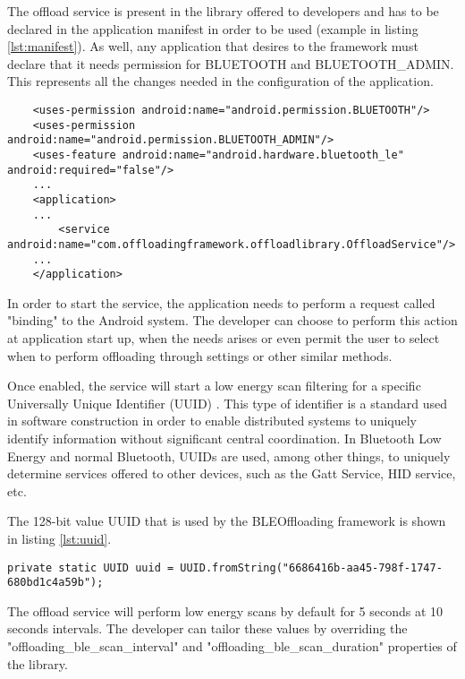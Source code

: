 The offload service is present in the library offered to developers and has to be declared in the application manifest in order to be used (example in listing \ref{lst:manifest}). As well, any application that desires to the framework must declare that it needs permission for BLUETOOTH and BLUETOOTH_ADMIN. This represents all the changes needed in the configuration of the application.

\pagebreak

\lstset{language=xml,caption=Example Application Manifest,label=lst:manifest}
\begin{lstlisting}
	<uses-permission android:name="android.permission.BLUETOOTH"/>
    <uses-permission android:name="android.permission.BLUETOOTH_ADMIN"/>
    <uses-feature android:name="android.hardware.bluetooth_le" android:required="false"/>
	...
	<application>
	...
		<service android:name="com.offloadingframework.offloadlibrary.OffloadService"/>
	...
    </application>
\end{lstlisting}


In order to start the service, the application needs to perform a request called "binding" to the Android system. The developer can choose to perform this action at application start up, when the needs arises or even permit the user to select when to perform offloading through settings or other similar methods.

Once enabled, the service will start a low energy scan filtering for a specific Universally Unique Identifier (UUID) . This type of identifier is a standard used in software construction in order to enable distributed systems to uniquely identify information without significant central coordination. In Bluetooth Low Energy and normal Bluetooth, UUIDs are used, among other things, to uniquely determine services offered to other devices, such as the Gatt Service, HID service, etc.

The 128-bit value UUID that is used by the BLEOffloading framework is shown in listing \ref{lst:uuid}.

\lstset{language=java,caption=UUID used for discovery of Offloading Service, label=lst:uuid}
\begin{lstlisting}
private static UUID uuid = UUID.fromString("6686416b-aa45-798f-1747-680bd1c4a59b");
\end{lstlisting}


The offload service will perform low energy scans by default for 5 seconds at 10 seconds intervals. The developer can tailor these values by overriding the "offloading_ble_scan_interval" and "offloading_ble_scan_duration" properties of the library.

